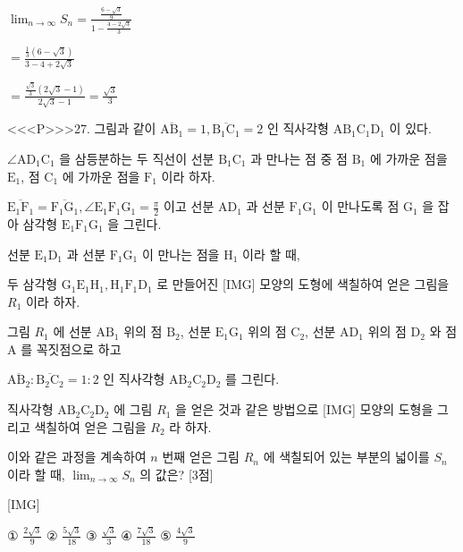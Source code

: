 \documentclass{oblivoir}
\begin{document}
$\lim _{n \rightarrow \infty} S_{n}= \frac{\frac{6-\sqrt{3}}{9}}{1-\frac{4-2 \sqrt{3}}{3}} $

$=\frac{\frac{1}{3}(6-\sqrt{3})}{3-4+2 \sqrt{3}}$

$=\frac{\frac{\sqrt{3}}{3}(2 \sqrt{3}-1)}{2 \sqrt{3}-1}=\frac{\sqrt{3}}{3}$

<<<P>>>27. 그림과 같이 $\overline{\mathrm{AB}_{1}}=1, \overline{\mathrm{B}_{1} \mathrm{C}_{1}}=2$ 인 직사각형 $\mathrm{AB}_{1} \mathrm{C}_{1} \mathrm{D}_{1}$ 이 있다.

$\angle \mathrm{AD}_{1} \mathrm{C}_{1}$ 을 삼등분하는 두 직선이 선분 $\mathrm{B}_{1} \mathrm{C}_{1}$ 과 만나는 점 중 점 $\mathrm{B}_{1}$ 에 가까운 점을 $\mathrm{E}_{1}$,
점 $\mathrm{C}_{1}$ 에 가까운 점을 $\mathrm{F}_{1}$ 이라 하자.

$\overline{\mathrm{E}_{1} \mathrm{F}_{1}}=\overline{\mathrm{F}_{1} \mathrm{G}_{1}}, \angle \mathrm{E}_{1} \mathrm{F}_{1} \mathrm{G}_{1}=\frac{\pi}{2}$ 이고
선분 $\mathrm{AD}_{1}$ 과 선분 $\mathrm{F}_{1} \mathrm{G}_{1}$ 이 만나도록 점 $\mathrm{G}_{1}$ 을 잡아 삼각형 $\mathrm{E}_{1} \mathrm{F}_{1} \mathrm{G}_{1}$ 을 그린다.

선분 $\mathrm{E}_{1} \mathrm{D}_{1}$ 과 선분 $\mathrm{F}_{1} \mathrm{G}_{1}$ 이 만나는 점을 $\mathrm{H}_{1}$ 이라 할 때,

두 삼각형 $\mathrm{G}_{1} \mathrm{E}_{1} \mathrm{H}_{1}, \mathrm{H}_{1} \mathrm{F}_{1} \mathrm{D}_{1}$ 로 만들어진 [IMG] 모양의 도형에 색칠하여 얻은 그림을 $R_{1}$ 이라 하자.

그림 $R_{1}$ 에 선분 $\mathrm{AB}_{1}$ 위의 점 $\mathrm{B}_{2}$, 선분 $\mathrm{E}_{1} \mathrm{G}_{1}$ 위의 점 $\mathrm{C}_{2}$, 선분 $\mathrm{AD}_{1}$ 위의 점 $\mathrm{D}_{2}$ 와 점 $\mathrm{A}$ 를 꼭짓점으로 하고 

$\overline{\mathrm{AB}_{2}}: \overline{\mathrm{B}_{2} \mathrm{C}_{2}}=1: 2$ 인 직사각형 $\mathrm{AB}_{2} \mathrm{C}_{2} \mathrm{D}_{2}$ 를 그린다.

직사각형 $\mathrm{AB}_{2} \mathrm{C}_{2} \mathrm{D}_{2}$ 에 그림 $R_{1}$ 을 얻은 것과 같은 방법으로 [IMG] 모양의 도형을 그리고 색칠하여 얻은 그림을 $R_{2}$ 라 하자.

이와 같은 과정을 계속하여 $n$ 번째 얻은 그림 $R_{n}$ 에 색칠되어 있는 부분의 넓이를 $S_{n}$ 이라 할 때, $\lim _{n \rightarrow \infty} S_{n}$ 의 값은? [3점]


[IMG]

① $\frac{2 \sqrt{3}}{9}$
② $\frac{5 \sqrt{3}}{18}$
③ $\frac{\sqrt{3}}{3}$
④ $\frac{7 \sqrt{3}}{18}$
⑤ $\frac{4 \sqrt{3}}{9}$
\end{document}
